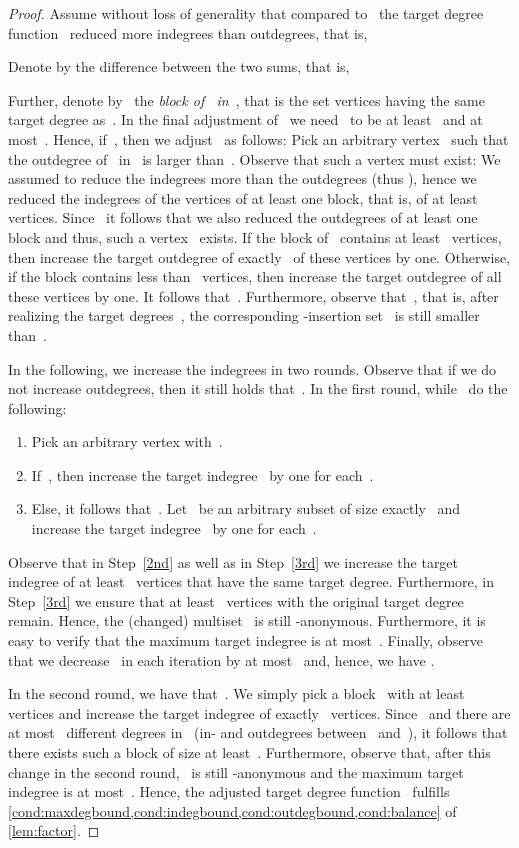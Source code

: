 \documentclass[a4paper,11pt]{article}
\theoremstyle{remark}
\theoremstyle{plain}
\theoremstyle{definition}
\begin{document}
\begin{proof}
	Assume without loss of generality that compared to~ the target degree function~ reduced more indegrees than outdegrees, that is,
        
	Denote by  the difference between the two sums, that is,
	
	Further, denote by~ the \emph{block of~ in~}, that is the set vertices having the same target degree as~.
	In the final adjustment of~ we need~ to be at least~ and at most~.
	Hence, if~, then we adjust~ as follows:
	Pick an arbitrary vertex~ such that the outdegree of~ in~ is larger than~.
	Observe that such a vertex must exist: 
	We assumed to reduce the indegrees more than the outdegrees (thus ), hence we reduced the indegrees of the vertices of at least one block, that is, of at least~ vertices. 
	Since~ it follows that we also reduced the outdegrees of at least one block and thus, such a vertex~ exists.
	If the block of~ contains at least~ vertices, then increase the target outdegree of exactly~ of these vertices by one.
	Otherwise, if the block contains less than~ vertices, then increase the target outdegree of all these vertices by one.
	It follows that~.
	Furthermore, observe that~, that is, after realizing the target degrees~, the corresponding -insertion set~ is still smaller than~.

	In the following, we increase the indegrees in two rounds.
	Observe that if we do not increase outdegrees, then it still holds that~.
	In the first round, while~ do the following:
	\begin{enumerate}
		\item Pick an arbitrary vertex with~.
		\item\label{2nd} If~, then increase the target indegree~ by one for each~.
		\item\label{3rd} Else, it follows that~. 
				Let~ be an arbitrary subset of size exactly~ and increase the target indegree~ by one for each~.
	\end{enumerate}
	Observe that in Step~\ref{2nd} as well as in Step~\ref{3rd} we increase the target indegree of at least~ vertices that have the same target degree.
	Furthermore, in Step~\ref{3rd} we ensure that at least~ vertices with the original target degree remain.
	Hence, the (changed) multiset~ is still -anonymous.
	Furthermore, it is easy to verify that the maximum target indegree is at most~.
	Finally, observe that we decrease~ in each iteration by at most~ and, hence, we have .
	
	In the second round, we have that~.
	We simply pick a block~ with at least~ vertices and increase the target indegree of exactly~ vertices.
	Since~ and there are at most~ different degrees in~ (in- and outdegrees between~ and~), it follows that there exists such a block of size at least~.
	Furthermore, observe that, after this change in the second round,~ is still -anonymous and the maximum target indegree is at most~.
	Hence, the adjusted target degree function~ fulfills \cref{cond:maxdegbound,cond:indegbound,cond:outdegbound,cond:balance} of \cref{lem:factor}.
        

\end{proof}
\end{document}
